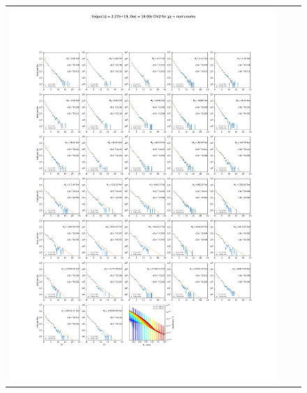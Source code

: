 \begin{figure}[!hb]
{\begin{tabular}{ccc}
            \includegraphics[clip, trim=22.1cm 6.5cm 19.5cm 56.5cm, scale=0.55]{figures/ic_DM/dm_plots/Segue1_numunumu_chi2_Masspanel_2024-03-23.pdf} &

\end{tabular}}
\end{figure}
